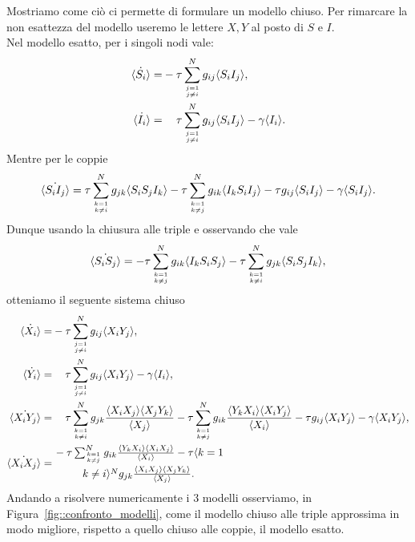 Mostriamo come ci\`o ci permette di formulare un modello chiuso. Per rimarcare la non esattezza del modello useremo le lettere $X,Y$ al posto di $S$ e $I$. \\
Nel  modello esatto, per i singoli nodi vale: \begin{equation*}
\begin{aligned}
	\dot{\angol{S_i}} = &-\tau \sum_{j=1\atop {j\neq i }} ^N g_{ij} \angol{S_i I_j},\\
	\dot{\angol{I_i}} = &\spa\tau \sum_{j=1\atop {j\neq i }} ^N g_{ij} \angol{S_i I_j} -\gamma \angol{I_i}.
\end{aligned}
\end{equation*}
Mentre per le coppie 
$$
\dot{\langle S_i I_j \rangle} = \tau \sum_{k=1\atop{k\neq i }}^N g_{jk} \langle S_iS_jI_k \rangle - \tau \sum_{k=1\atop{k\neq j }}^N g_{ik} \langle I_kS_iI_j \rangle - \tau  g_{ij} \langle S_i I_j \rangle  -\gamma \langle S_i I_j \rangle.
$$
Dunque usando la chiusura alle triple e osservando che vale
$$ \dot{\langle S_i S_j \rangle} = -\tau \sum_{k=1\atop{k \neq j}}^N g_{ik} \langle I_kS_iS_j \rangle - \tau \sum_{k=1\atop{k\neq i }}^N g_{jk} \langle S_iS_jI_k \rangle,$$ 
otteniamo il seguente sistema chiuso 
\begin{equation}\label{Chiuso_triple}
\begin{aligned}
		\dot{\angol{X_i}} = &-\tau \sum_{j=1\atop {j\neq i }} ^N g_{ij} \angol{X_i Y_j},\\
	\dot{\angol{Y_i}} = &\spa\tau \sum_{j=1\atop {j\neq i }} ^N g_{ij} \angol{X_i Y_j} -\gamma \angol{I_i}, \\
\dot{\angol{X_i Y_j}} =& \spa \tau \sum_{k=1\atop{k\neq i }}^N g_{jk} \frac{\angol{X_iX_j}\angol{X_jY_k}}{\angol{X_j}} - \tau \sum_{k=1\atop{k\neq j }}^N g_{ik} \frac{\angol{Y_kX_i}\angol{X_iY_j}}{\angol{X_i}}- \tau  g_{ij} \angol{X_i Y_j}  -\gamma \angol{X_i Y_j},\\
\dot{\angol{X_i X_j}} = &-\tau \sum_{k=1\atop{k \neq j}}^N g_{ik} \frac{\angol{Y_kX_i}\angol{X_iX_j}}{\angol{X_i}} - \tau \angol{k=1\atop{k\neq i }}^N g_{jk} \frac{\angol{X_iX_j}\angol{X_jY_k}}{\angol{X_j}}.
\end{aligned}
\end{equation} 
Andando a risolvere numericamente i $3$ modelli osserviamo, in Figura~\ref{fig::confronto_modelli}, come il modello chiuso alle triple approssima in modo migliore, rispetto a quello chiuso alle coppie, il modello esatto.
